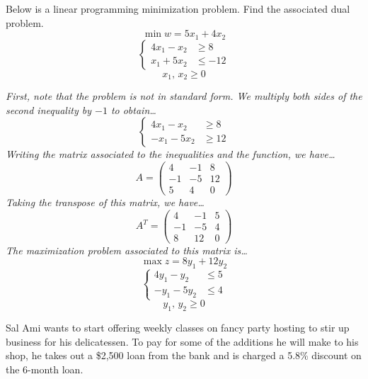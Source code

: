 \documentclass[12pt,letterpaper]{exam}
\begin{document}
\begin{questions}
\newpage
\question[10] Below is a linear programming minimization problem. Find the associated dual problem. 
	\[
	\min w= 5x_1 + 4x_2
	\]
	\[
	\left\{
	\begin{aligned}
	4x_1 - x_2 &\geq 8 \\
	x_1 + 5x_2&\leq -12
	\end{aligned} \right.
	\]
	\[
	x_1,\, x_2 \geq 0
	\] \pspace

{\itshape First, note that the problem is not in standard form. We multiply both sides of the second inequality by $-1$ to obtain\dots \pspace
	\[
	\left\{
	\begin{aligned}
	4x_1 - x_2 &\geq 8 \\
	-x_1 - 5x_2&\geq 12
	\end{aligned} \right.
	\] \pspace
Writing the matrix associated to the inequalities and the function, we have\dots \pspace
	\[
	A= 
	\begin{pmatrix}
	4 & -1 & 8 \\
	-1 & -5 & 12 \\
	5 & 4 & 0 
	\end{pmatrix}
	\] \pspace
Taking the transpose of this matrix, we have\dots \pspace
	\[
	A^T= 
	\begin{pmatrix}
	4 & -1 & 5 \\
	-1 & -5 & 4 \\
	8 & 12 & 0 
	\end{pmatrix}
	\] \pspace
The maximization problem associated to this matrix is\dots \pspace
	\[
	\max z= 8y_1 + 12y_2
	\]
	\[
	\left\{
	\begin{aligned}
	4y_1 - y_2&\leq 5 \\
	-y_1 - 5y_2&\leq 4
	\end{aligned} \right.
	\]
	\[
	y_1,\, y_2 \geq 0
	\] 
}
	


\newpage
\question Sal Ami wants to start offering weekly classes on fancy party hosting to stir up business for his delicatessen. To pay for some of the additions he will make to his shop, he takes out a \$2,500 loan from the bank and is charged a 5.8\% discount on the 6-month loan. \pspace

\end{questions}
\end{document}
